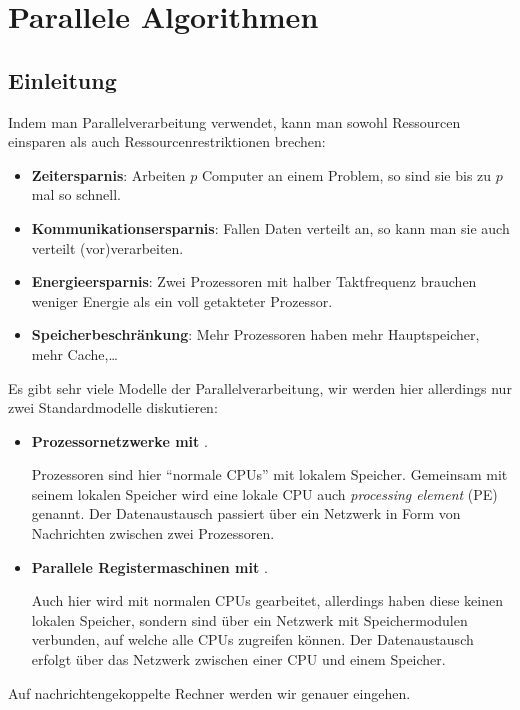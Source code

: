 \chapter{Parallele Algorithmen}

\section{Einleitung}

Indem man Parallelverarbeitung verwendet, kann man sowohl Ressourcen einsparen als auch Ressourcenrestriktionen brechen:
\begin{itemize}
  \item \textbf{Zeitersparnis}: Arbeiten \( p \) Computer an einem Problem, so sind sie bis zu \( p \) mal so schnell.
  \item \textbf{Kommunikationsersparnis}: Fallen Daten verteilt an, so kann man sie auch verteilt (vor)verarbeiten.
  \item \textbf{Energieersparnis}: Zwei Prozessoren mit halber Taktfrequenz brauchen weniger Energie als ein voll getakteter Prozessor.
  \item \textbf{Speicherbeschränkung}: Mehr Prozessoren haben mehr Hauptspeicher, mehr Cache,\dots
\end{itemize}

Es gibt sehr viele Modelle der Parallelverarbeitung, wir werden hier allerdings nur zwei Standardmodelle diskutieren:
\begin{itemize}
  \item \textbf{Prozessornetzwerke mit} .

    Prozessoren sind hier ``normale CPUs'' mit lokalem Speicher. Gemeinsam mit seinem lokalen Speicher wird eine lokale CPU auch \emph{processing element} (PE) genannt. Der Datenaustausch passiert über ein Netzwerk in Form von Nachrichten zwischen zwei Prozessoren.
  \item \textbf{Parallele Registermaschinen mit} .

    Auch hier wird mit normalen CPUs gearbeitet, allerdings haben diese keinen lokalen Speicher, sondern sind über ein Netzwerk mit Speichermodulen verbunden, auf welche alle CPUs zugreifen können. Der Datenaustausch erfolgt über das Netzwerk zwischen einer CPU und einem Speicher.
\end{itemize}

Auf nachrichtengekoppelte Rechner werden wir genauer eingehen.

